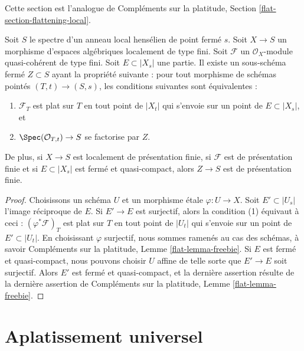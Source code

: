 \noindent
Cette section est l'analogue de Compléments sur la platitude, Section
\ref{flat-section-flattening-local}.

\begin{lemma}
\label{lemma-freebie}
Soit $S$ le spectre d'un anneau local hensélien de point fermé $s$.
Soit $X \to S$ un morphisme d'espaces algébriques
localement de type fini.
Soit $\mathcal{F}$ un $\mathcal{O}_X$-module quasi-cohérent de type fini.
Soit $E \subset |X_s|$ une partie. Il existe un sous-schéma fermé
$Z \subset S$ ayant la propriété suivante : pour tout morphisme de schémas
pointés $(T, t) \to (S, s)$, les conditions suivantes sont équivalentes :
\begin{enumerate}
\item $\mathcal{F}_T$ est plat sur $T$ en tout point de
$|X_t|$ qui s'envoie sur un point de $E \subset |X_s|$, et
\item $\Spec(\mathcal{O}_{T, t}) \to S$ se factorise par $Z$.
\end{enumerate}
De plus, si $X \to S$ est localement de présentation finie,
si $\mathcal{F}$ est de présentation finie et si $E \subset |X_s|$ est
fermé et quasi-compact, alors $Z \to S$ est de présentation finie.
\end{lemma}

\begin{proof}
Choisissons un schéma $U$ et un morphisme \'etale $\varphi : U \to X$.
Soit $E' \subset |U_s|$ l'image réciproque de $E$. Si
$E' \to E$ est surjectif, alors la condition (1) équivaut à ceci :
$(\varphi^*\mathcal{F})_T$ est plat sur $T$ en tout point de
$|U_t|$ qui s'envoie sur un point de $E' \subset |U_t|$.
En choisissant $\varphi$ surjectif, nous sommes ramenés au cas des schémas, à savoir
Compléments sur la platitude, Lemme \ref{flat-lemma-freebie}.
Si $E$ est fermé et quasi-compact, nous pouvons choisir $U$
affine de telle sorte que $E' \to E$ soit surjectif. Alors $E'$ est fermé
et quasi-compact, et la dernière assertion résulte de la
dernière assertion de
Compléments sur la platitude, Lemme \ref{flat-lemma-freebie}.
\end{proof}









\section{Aplatissement universel}
\label{section-flattening-final}

